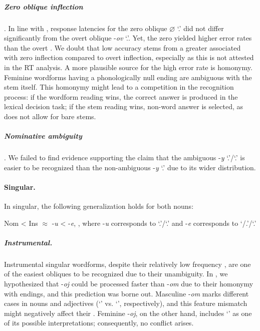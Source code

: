 \documentclass[output=paper, modfonts,newtxmath,hidelinks]{langscibook}
\begin{document}
\subparagraph*{{Zero oblique inflection}}. In line with \citet{gor2017processing}, response latencies for the zero oblique \textit{$\varnothing$} `\genn.\pl' did not differ significantly from the overt oblique -\textit{ov} `\genn.\pl'. Yet, the zero  yielded higher error rates than the overt . We doubt that low accuracy stems from a greater  associated with zero inflection compared to overt inflection, especially as this is not attested in the RT analysis. A more plausible source for the high error rate is homonymy. Feminine   wordforms having a phonologically null ending are ambiguous with the stem itself. This homonymy might lead to a competition in the recognition process: if the wordform reading wins, the correct answer is produced in the lexical decision task; if the stem reading wins, non-word answer is selected, as  does not allow for bare stems.

\subparagraph*{{Nominative ambiguity}}. We failed to find evidence supporting the claim that the ambiguous  -\textit{y} `\nomm.\pl'\slash `\genn.\sg' is easier to be recognized than the non-ambiguous  -\textit{y} `\nomm.\pl' due to its wider distribution.\\

\paragraph*{Singular.} In singular, the following generalization holds for both nouns:

\ea	Nom < Ins $\approx$ -\textit{u} < -\textit{e}, , where -\textit{u} corresponds to `\accc.\fem'\slash `\datt.\masc' and -\textit{e} corresponds to `{\datt/\locc.\fem}’\slash `{\locc.\masc}’
\z 

\subparagraph*{{Instrumental.}} Instrumental singular wordforms, despite their relatively low frequency \citep{samojlova2014frequencies}, are one of the easiest obliques to be recognized due to their unambiguity. In , we hypothesized that   -\textit{oj} could be processed faster than   -\textit{om} due to their homonymy with  endings, and this prediction was borne out. Masculine -\textit{om} marks different cases in nouns and adjectives (`\ins' vs. `\locc', respectively), and this feature mismatch might negatively affect their . Feminine  -\textit{oj}, on the other hand, includes `\ins' as one of its possible interpretations; consequently, no conflict arises.
\end{document}
